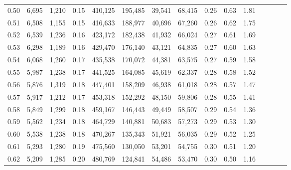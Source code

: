 \begin{tabular}{rrrcrrrrrrrrrrr}
0.50 &   6,695 &   1,210 &                                       0.15 &  410,125 &  195,485 &   39,541 &   68,415 &  0.26 &  0.63 &                         1.81 \\
0.51 &   6,508 &   1,155 &                                       0.15 &  416,633 &  188,977 &   40,696 &   67,260 &  0.26 &  0.62 &                         1.75 \\
0.52 &   6,539 &   1,236 &                                       0.16 &  423,172 &  182,438 &   41,932 &   66,024 &  0.27 &  0.61 &                         1.69 \\
0.53 &   6,298 &   1,189 &                                       0.16 &  429,470 &  176,140 &   43,121 &   64,835 &  0.27 &  0.60 &                         1.63 \\
0.54 &   6,068 &   1,260 &                                       0.17 &  435,538 &  170,072 &   44,381 &   63,575 &  0.27 &  0.59 &                         1.58 \\
0.55 &   5,987 &   1,238 &                                       0.17 &  441,525 &  164,085 &   45,619 &   62,337 &  0.28 &  0.58 &                         1.52 \\
0.56 &   5,876 &   1,319 &                                       0.18 &  447,401 &  158,209 &   46,938 &   61,018 &  0.28 &  0.57 &                         1.47 \\
0.57 &   5,917 &   1,212 &                                       0.17 &  453,318 &  152,292 &   48,150 &   59,806 &  0.28 &  0.55 &                         1.41 \\
0.58 &   5,849 &   1,299 &                                       0.18 &  459,167 &  146,443 &   49,449 &   58,507 &  0.29 &  0.54 &                         1.36 \\
0.59 &   5,562 &   1,234 &                                       0.18 &  464,729 &  140,881 &   50,683 &   57,273 &  0.29 &  0.53 &                         1.30 \\
0.60 &   5,538 &   1,238 &                                       0.18 &  470,267 &  135,343 &   51,921 &   56,035 &  0.29 &  0.52 &                         1.25 \\
0.61 &   5,293 &   1,280 &                                       0.19 &  475,560 &  130,050 &   53,201 &   54,755 &  0.30 &  0.51 &                         1.20 \\
0.62 &   5,209 &   1,285 &                                       0.20 &  480,769 &  124,841 &   54,486 &   53,470 &  0.30 &  0.50 &                         1.16 \\

\end{tabular}
